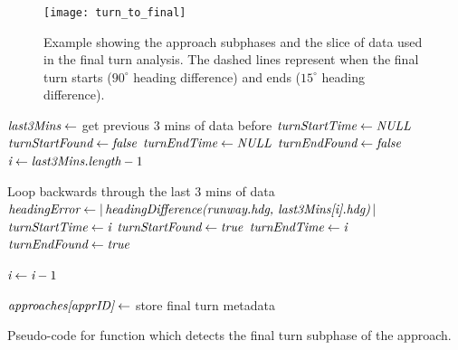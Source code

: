            \begin{figure}
            	\centering
                \texttt{[image: turn\_to\_final]}
                \caption{Example showing the approach subphases and the slice of data used in the final turn analysis.  The dashed lines represent when the final turn starts ($90^\circ$ heading difference) and ends ($15^\circ$ heading difference).}
                \label{fig:final_turn_example}
            \end{figure}
        
            \begin{algorithm}
                \begin{algorithmic}[1]\raggedright
                        \State $ \textit{last3Mins} \gets $ get previous 3 mins of data before 
                        \State $ \textit{turnStartTime} \gets \textit{NULL} $
                        \State $ \textit{turnStartFound} \gets \textit{false} $
                        \State $ \textit{turnEndTime} \gets \textit{NULL} $
                        \State $ \textit{turnEndFound} \gets \textit{false} $
                        \State $ \textit{i} \gets \textit{last3Mins.length} - 1 $
                        
                        \Comment Loop backwards through the last 3 mins of data
                        	\State $ \textit{headingError} \gets \left|\,\textit{headingDifference(runway.hdg, last3Mins[i].hdg)}\,\right| $
                            	\State $ \textit{turnStartTime} \gets \textit{i} $
                                \State $ \textit{turnStartFound} \gets \textit{true} $
                            \EndIf
                            	\State $ \textit{turnEndTime} \gets \textit{i} $
                                \State $ \textit{turnEndFound} \gets \textit{true} $
                            \EndIf
                            
                            \State $ \textit{i} \gets \textit{i} - 1 $
                        \EndWhile
                        
                        \State $ \textit{approaches[apprID]} \gets $ store final turn metadata
                        \State \Return {}
                    \EndFunction
                \end{algorithmic}
                \caption{Pseudo-code for function which detects the final turn subphase of the approach.}
                \label{fig:detect_final_turn}
            \end{algorithm}
        
